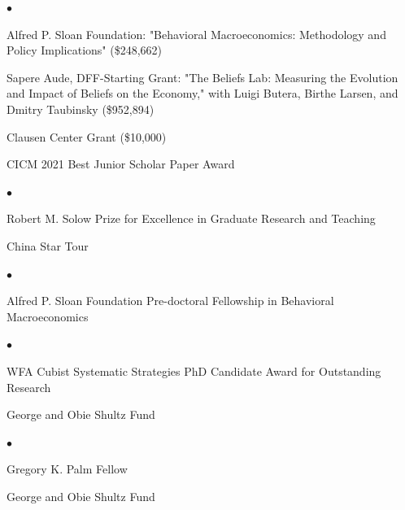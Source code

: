 \documentclass[line]{res}
\newenvironment{list1}{
  \begin{list}{\ding{113}}{%
      \setlength{\itemsep}{0.07in}
      \setlength{\parsep}{0in} \setlength{\parskip}{0in}
		\setlength{\topsep}{0.07in} \setlength{\partopsep}{0in} 
      \setlength{\leftmargin}{0.0in}}}{\end{list}}
\newenvironment{list2}{
  \begin{list}{$\bullet$}{%
      \setlength{\itemsep}{0in}
      \setlength{\parsep}{0in} \setlength{\parskip}{0in}
      \setlength{\topsep}{0in} \setlength{\partopsep}{0in} 
      \setlength{\leftmargin}{0in}}}{\end{list}}
\begin{document}
\begin{resume}
\begin{list1}
\begin{list2}
\item[] Alfred P. Sloan Foundation: "Behavioral Macroeconomics: Methodology and Policy Implications" (\$248,662)
\vspace{0.2cm}

\item[] Sapere Aude, DFF-Starting Grant: "The Beliefs Lab: Measuring the Evolution and Impact of Beliefs on the Economy," with Luigi Butera, Birthe Larsen, and Dmitry Taubinsky (\$952,894)
\vspace{0.2cm}

\item[] Clausen Center Grant (\$10,000)
\vspace{0.2cm}

\item[] CICM 2021 Best Junior Scholar Paper Award
\end{list2}

\item[2020]
\begin{list2}
\item[] Robert M. Solow Prize for Excellence in Graduate Research and Teaching
\vspace{0.2cm}

\item[] China Star Tour

\end{list2}
\item[2019] 
\begin{list2}
\item[] Alfred P. Sloan Foundation Pre-doctoral Fellowship in Behavioral Macroeconomics
\end{list2}

\item[2017] 
\begin{list2}
\item[] WFA Cubist Systematic Strategies PhD Candidate Award for
Outstanding Research
\vspace{0.2cm}

\item[] George and Obie Shultz Fund
\end{list2}

\item[2016] 
\begin{list2}
\item[]  Gregory K. Palm Fellow
\vspace{0.2cm}

\item[] George and Obie Shultz Fund
\end{list2}


\end{list1}
\end{resume}
\end{document}
